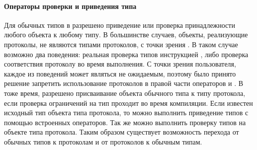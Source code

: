 \paragraph{Операторы проверки и приведения типа}
Для обычных типов в  разрешено приведение или проверка принадлежности любого объекта к любому типу. В большинстве случаев, объекты, реализующие протоколы, не являются типами протоколов, с точки зрения . В таком случае возможно два поведения: реальная проверка типов инструкцией , либо проверка соответствия протоколу во время выполнения. С точки зрения пользователя, каждое из поведений может являться не ожидаемым, поэтому было принято решение запретить использование протоколов в правой части операторов  и . В тоже время, разрешено присваивание объекта обычного типа к типу протокола, если проверка ограничений на тип проходит во время компиляции. Если известен исходный тип объекта типа протокола, то можно выполнить приведение типов с помощью встроенных операторов. Так же можно выполнить проверку типов на объекте типа протокола. Таким образом существует возможность перехода от обычных типов к протоколам и от протоколов к обычным типам.
